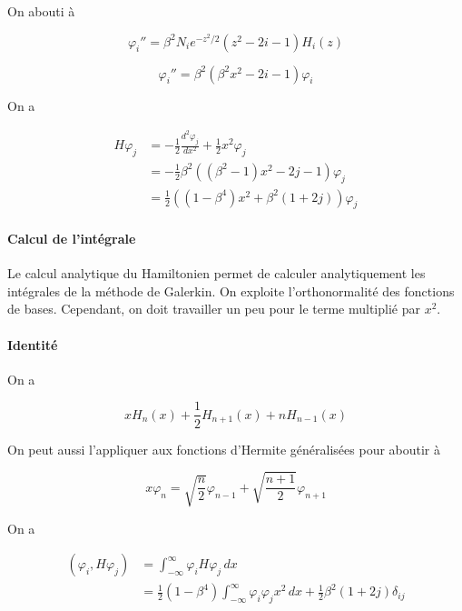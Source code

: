 \documentclass[
]{article}
\begin{document}
On abouti à

\[
\varphi_{i}''=\beta^{2}N_{i}e^{-z^{2}/2}(z^{2}-2i-1)H_{i}(z)
\]

\[
\varphi_{i}''=\beta^{2}(\beta^{2}x^{2}-2i-1)\varphi_{i}
\]

On a

\[
\begin{aligned}
H\varphi_{j} & = -\frac{1}{2} \frac{d^{2}\varphi_{j}}{dx^{2}} + \frac{1}{2}x^{2}\varphi_{j} \\
&=-\frac{1}{2}\beta^{2}((\beta^{2}-1)x^{2}-2j-1)\varphi_{j} \\
&= \frac{1}{2}((1-\beta^{4})x^{2}+\beta^{2}(1+2j))\varphi_{j}
\end{aligned}
\]

\hypertarget{calcul-de-lintuxe9grale}{%
\paragraph{Calcul de l'intégrale}\label{calcul-de-lintuxe9grale}}

Le calcul analytique du Hamiltonien permet de calculer analytiquement
les intégrales de la méthode de Galerkin. On exploite l'orthonormalité
des fonctions de bases. Cependant, on doit travailler un peu pour le
terme multiplié par \(x^{2}\).

\hypertarget{identituxe9}{%
\paragraph{Identité}\label{identituxe9}}

On a

\[
xH_{n}(x)+ \frac{1}{2}H_{n+1}(x)+nH_{n-1}(x)
\]

On peut aussi l'appliquer aux fonctions d'Hermite généralisées pour
aboutir à

\[
x\varphi_{n}= \sqrt{ \frac{n}{2} }\varphi_{n-1}+\sqrt{ \frac{n+1}{2} }\varphi_{n+1}
\]

On a

\[
\begin{align}
(\varphi_{i},H\varphi_{j}) & =\int_{-\infty}^{\infty} \varphi_{i}H\varphi_{j} \, dx  \\
&=\frac{1}{2} (1-\beta^{4})\int_{-\infty}^{\infty} \varphi_{i}\varphi_{j}x^{2} \, dx + \frac{1}{2}\beta^{2}(1+2j)\delta_{ij} 
\end{align}
\]
\end{document}
